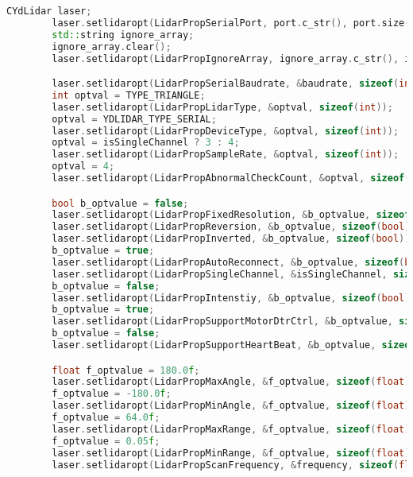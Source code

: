     \begin{lstlisting}[language={C++}, caption={Configuraci\'on de opciones del LiDAR}, label={ere}]
        CYdLidar laser;
        laser.setlidaropt(LidarPropSerialPort, port.c_str(), port.size());
        std::string ignore_array;
        ignore_array.clear();
        laser.setlidaropt(LidarPropIgnoreArray, ignore_array.c_str(), ignore_array.size());

        laser.setlidaropt(LidarPropSerialBaudrate, &baudrate, sizeof(int));
        int optval = TYPE_TRIANGLE;
        laser.setlidaropt(LidarPropLidarType, &optval, sizeof(int));
        optval = YDLIDAR_TYPE_SERIAL;
        laser.setlidaropt(LidarPropDeviceType, &optval, sizeof(int));
        optval = isSingleChannel ? 3 : 4;
        laser.setlidaropt(LidarPropSampleRate, &optval, sizeof(int));
        optval = 4;
        laser.setlidaropt(LidarPropAbnormalCheckCount, &optval, sizeof(int));

        bool b_optvalue = false;
        laser.setlidaropt(LidarPropFixedResolution, &b_optvalue, sizeof(bool));
        laser.setlidaropt(LidarPropReversion, &b_optvalue, sizeof(bool));
        laser.setlidaropt(LidarPropInverted, &b_optvalue, sizeof(bool));
        b_optvalue = true;
        laser.setlidaropt(LidarPropAutoReconnect, &b_optvalue, sizeof(bool));
        laser.setlidaropt(LidarPropSingleChannel, &isSingleChannel, sizeof(bool));
        b_optvalue = false;
        laser.setlidaropt(LidarPropIntenstiy, &b_optvalue, sizeof(bool));
        b_optvalue = true;
        laser.setlidaropt(LidarPropSupportMotorDtrCtrl, &b_optvalue, sizeof(bool));
        b_optvalue = false;
        laser.setlidaropt(LidarPropSupportHeartBeat, &b_optvalue, sizeof(bool));

        float f_optvalue = 180.0f;
        laser.setlidaropt(LidarPropMaxAngle, &f_optvalue, sizeof(float));
        f_optvalue = -180.0f;
        laser.setlidaropt(LidarPropMinAngle, &f_optvalue, sizeof(float));
        f_optvalue = 64.0f;
        laser.setlidaropt(LidarPropMaxRange, &f_optvalue, sizeof(float));
        f_optvalue = 0.05f;
        laser.setlidaropt(LidarPropMinRange, &f_optvalue, sizeof(float));
        laser.setlidaropt(LidarPropScanFrequency, &frequency, sizeof(float));

    \end{lstlisting}
    \vskip 0.5cm
